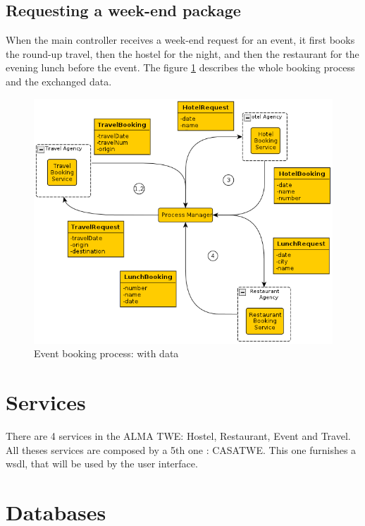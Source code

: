 \documentclass[a4paper]{article}
\begin{document}
			
			
		\subsection{Requesting a week-end package}
		
			When the main controller receives a week-end request for an event, it first books the round-up travel, then the hostel for the night, and then the restaurant for the evening lunch before the event. The figure \ref{fig:bookingprocess} describes the whole booking process and the exchanged data.
			
			\begin{figure}[htp]
				\centering
				\includegraphics[width=\textwidth]{processmanager.png}
				\caption{Event booking process: with data}
				\label{fig:bookingprocess}
			\end{figure}
			
	
	
	\section{Services}
	
		There are 4 services in the ALMA TWE: Hostel, Restaurant, Event and Travel. All theses services are composed by a 5th one : CASATWE. This one furnishes a wsdl, that will be used by the user interface.
	
	
	\section{Databases}
	
\end{document}
